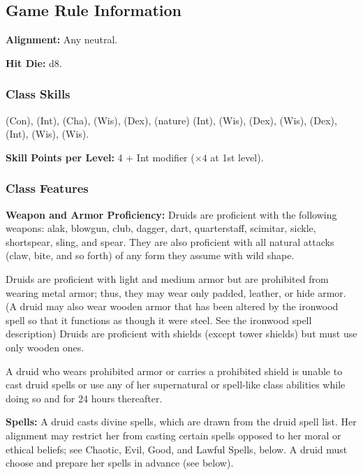\subsection{Game Rule Information}

\textbf{Alignment:} Any neutral.

\textbf{Hit Die:} d8.

\subsubsection{Class Skills}
 (Con),  (Int),  (Cha),  (Wis),  (Dex),  (nature) (Int),  (Wis),  (Dex),  (Wis),  (Dex),  (Int),  (Wis),  (Wis).

\textbf{Skill Points per Level:} 4 + Int modifier ($\times4$ at 1st level).

\subsubsection{Class Features}

\textbf{Weapon and Armor Proficiency:} Druids are proficient with the following weapons: alak, blowgun, club, dagger, dart, quarterstaff, scimitar, sickle, shortspear, sling, and spear. They are also proficient with all natural attacks (claw, bite, and so forth) of any form they assume with wild shape.

Druids are proficient with light and medium armor but are prohibited from wearing metal armor; thus, they may wear only padded, leather, or hide armor. (A druid may also wear wooden armor that has been altered by the ironwood spell so that it functions as though it were steel. See the ironwood spell description) Druids are proficient with shields (except tower shields) but must use only wooden ones.

A druid who wears prohibited armor or carries a prohibited shield is unable to cast druid spells or use any of her supernatural or spell-like class abilities while doing so and for 24 hours thereafter.

\textbf{Spells:} A druid casts divine spells, which are drawn from the druid spell list. Her alignment may restrict her from casting certain spells opposed to her moral or ethical beliefs; see Chaotic, Evil, Good, and Lawful Spells, below. A druid must choose and prepare her spells in advance (see below).


